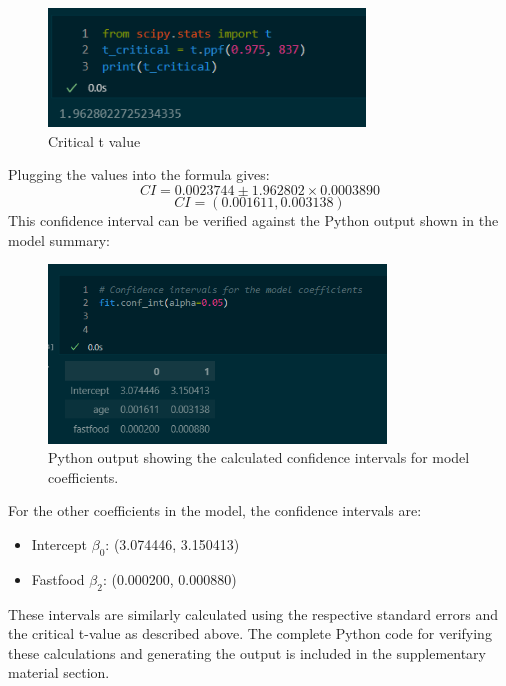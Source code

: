 \documentclass{rapport}
\begin{document}
\begin{figure}[H]
    \centering
    \includegraphics[width=0.75\textwidth]{Figures/t_critical.png}
    \caption{\small Critical t value}
    \label{fig:critical_t_value}
\end{figure}
\noindent
Plugging the values into the formula gives:
\[
CI = 0.0023744 \pm 1.962802 \times 0.0003890
\]
\[
CI = (0.001611, 0.003138)
\]
\noindent
This confidence interval can be verified against the Python output shown in the model summary:

\begin{figure}[H]
    \centering
    \includegraphics[width=0.8\textwidth]{Figures/confidence_interval.png}
    \caption{\small Python output showing the calculated confidence intervals for model coefficients.}
    \label{fig:python_output}
\end{figure}
\noindent
For the other coefficients in the model, the confidence intervals are:
\begin{itemize}
    \item Intercept \( \beta_0 \): (3.074446, 3.150413)
    \item Fastfood \( \beta_2 \): (0.000200, 0.000880)
\end{itemize}
\noindent
These intervals are similarly calculated using the respective standard errors and the critical t-value as described above. The complete Python code for verifying these calculations and generating the output is included in the supplementary material section.
\end{document}
